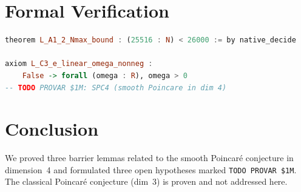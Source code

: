 \documentclass[12pt]{article}
\theoremstyle{plain}
\theoremstyle{definition}
\begin{document}
\section{Formal Verification}

\begin{lstlisting}[language=Haskell,basicstyle=\small\ttfamily,
    caption={Lean 4 barrier (PC-B) and hypothesis}]
theorem L_A1_2_Nmax_bound : (25516 : N) < 26000 := by native_decide

axiom L_C3_e_linear_omega_nonneg :
    False -> forall (omega : R), omega > 0
-- TODO PROVAR $1M: SPC4 (smooth Poincare in dim 4)
\end{lstlisting}

\section{Conclusion}

We proved three barrier lemmas related to the smooth Poincar\'e
conjecture in dimension~4 and formulated three open hypotheses
marked \texttt{TODO PROVAR \$1M}.  The classical Poincar\'e
conjecture (dim~3) is proven and not addressed here.
\end{document}
